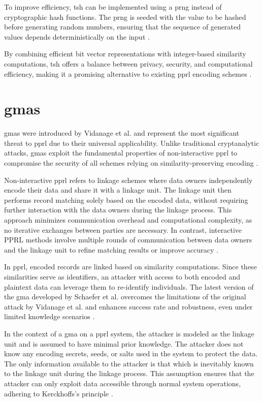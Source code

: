 To improve efficiency, \ac{tsh} can be implemented using a \ac{prng} instead of cryptographic hash functions.
The \ac{prng} is seeded with the value to be hashed before generating random numbers, ensuring that the sequence of generated values depends deterministically on the input \cite{schaefer2024}.

By combining efficient bit vector representations with integer-based similarity computations, \ac{tsh} offers a balance between privacy, security, and computational efficiency, making it a promising alternative to existing \ac{pprl} encoding schemes \cite{vidanage2020graph, schaefer2024}.

\section{\ac{gma}s} \label{sec:gma}

\ac{gma}s  were introduced by Vidanage et al. \cite{vidanage2020graph} and represent the most significant threat to \ac{pprl} due to their universal applicability.
Unlike traditional cryptanalytic attacks, \ac{gma}s exploit the fundamental properties of non-interactive \ac{pprl} to compromise the security of all schemes relying on similarity-preserving encoding \cite{schaefer2024}.


Non-interactive \ac{pprl} refers to linkage schemes where data owners independently encode their data and share it with a linkage unit.
The linkage unit then performs record matching solely based on the encoded data, without requiring further interaction with the data owners during the linkage process.
This approach minimizes communication overhead and computational complexity, as no iterative exchanges between parties are necessary.
In contrast, interactive PPRL methods involve multiple rounds of communication between data owners and the linkage unit to refine matching results or improve accuracy \cite{kum2014privacy}.

In \ac{pprl}, encoded records are linked based on similarity computations.
Since these similarities serve as identifiers, an attacker with access to both encoded and plaintext data can leverage them to re-identify individuals.
The latest version of the \ac{gma} developed by Schaefer et al. \cite{schaefer2024} overcomes the limitations of the original attack by Vidanage et al. \cite{vidanage2020graph} and enhances success rate and robustness, even under limited knowledge scenarios \cite{schaefer2024}.

In the context of a \ac{gma} on a \ac{pprl} system, the attacker is modeled as the linkage unit and is assumed to have minimal prior knowledge.
The attacker does not know any encoding secrets, seeds, or salts used in the system to protect the data.
The only information available to the attacker is that which is inevitably known to the linkage unit during the linkage process.
This assumption ensures that the attacker can only exploit data accessible through normal system operations, adhering to Kerckhoffs's principle \cite{schaefer2024}.

